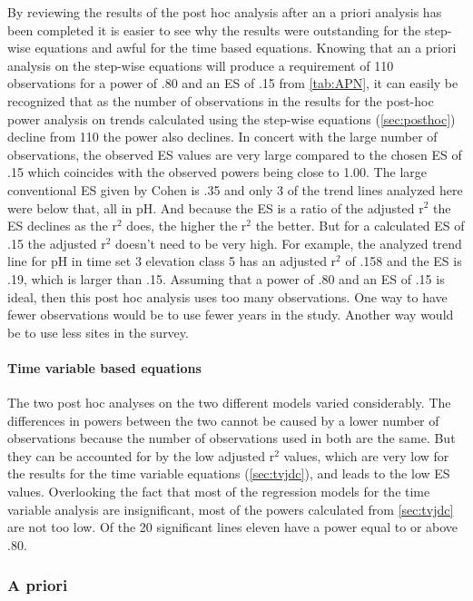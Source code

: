 By reviewing the results of the post hoc analysis after an a priori analysis has been completed it is easier to see why the results were outstanding for the step-wise equations and awful for the time based equations.
Knowing that an a priori analysis on the step-wise equations will produce a requirement of 110 observations for a power of .80 and an ES of .15 from \autoref{tab:APN}, it can easily be recognized that as the number of observations in the results for the post-hoc power analysis on trends calculated using the step-wise equations (\autoref{sec:posthoc}) decline from 110 the power also declines.
In concert with the large number of observations, the observed ES values are very large compared to the chosen ES of .15 which coincides with the observed powers being close to 1.00.
The large conventional ES given by Cohen is .35 and only 3 of the trend lines analyzed here were below that, all in pH.
And because the ES is a ratio of the adjusted r$^2$ the ES declines as the r$^2$ does, the higher the r$^2$ the better.
But for a calculated ES of .15 the adjusted r$^2$ doesn't need to be very high.
For example, the analyzed trend line for pH in time set 3 elevation class 5 has an adjusted r$^2$ of .158 and the ES is .19, which is larger than .15.
Assuming that a power of .80 and an ES of .15 is ideal, then this post hoc analysis uses too many observations.
One way to have fewer observations would be to use fewer years in the study.
Another way would be to use less sites in the survey.

\paragraph{Time variable based equations}

The two post hoc analyses on the two different models varied considerably.
The differences in powers between the two cannot be caused by a lower number of observations because the number of observations used in both are the same.
But they can be accounted for by the low adjusted r$^2$ values, which are very low for the results for the time variable equations (\autoref{sec:tvjdc}), and leads to the low ES values.
Overlooking the fact that most of the regression models for the time variable analysis are insignificant, most of the powers calculated from \autoref{sec:tvjdc} are not too low.
Of the 20 significant lines eleven have a power equal to or above .80.

\subsubsection{A priori}%

